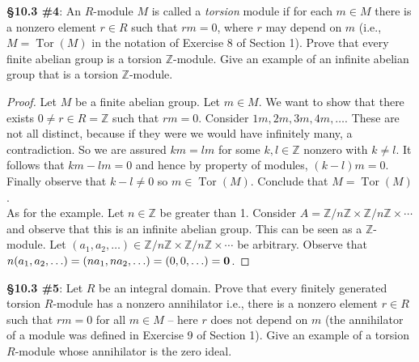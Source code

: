 \documentclass[8pt]{amsart}
\theoremstyle{plain}%
\theoremstyle{definition}
\theoremstyle{remark}
\numberwithin{equation}{section}
\newcommand{\Z}{\mathbb{Z}}
\begin{document}
\textbf{\S 10.3 \#4}: An $R$-module $M$ is called a \textit{torsion} module if for each $m \in M$ there is a nonzero element $r \in R$ such that $rm = 0$, where $r$ may depend on $m$ (i.e., $M = \operatorname{Tor}(M)$ in the notation of Exercise 8 of Section 1). Prove that every finite abelian group is a torsion $\Z$-module. Give an example of an infinite abelian group that is a torsion $\Z$-module.
	\begin{proof}
	
		Let $M$ be a finite abelian group. Let $m \in M$. We want to show that there exists $0 \neq r \in R = \Z$ such that $rm = 0$. Consider $1m, 2m, 3m, 4m, \ldots$. These are not all distinct, because if they were we would have infinitely many, a contradiction. So we are assured $km = lm$ for some $k, l \in \Z$ nonzero with $k \neq l$. It follows that $km - lm = 0$ and hence by property of modules, $(k - l)m = 0$. Finally observe that $k - l \neq 0$ so $m \in \operatorname{Tor}(M)$. Conclude that $M = \operatorname{Tor}(M)$.\\

		As for the example. Let $n \in \Z$ be greater than 1. Consider $A = \Z/n\Z \times \Z/n\Z \times \cdots$ and observe that this is an infinite abelian group. This can be seen as a $\Z$-module. Let $(a_1, a_2, \ldots) \in \Z/n\Z \times \Z/n\Z \times \cdots$ be arbitrary. Observe that $n(a_1, a_2, \ldots) = (na_1, na_2, \ldots) = (0, 0, \ldots) = \textbf 0$.
	\end{proof}
\textbf{\S 10.3 \#5}: Let $R$ be an integral domain. Prove that every finitely generated torsion $R$-module has a nonzero annihilator i.e., there is a nonzero element $r \in R$ such that $rm = 0$ for all $m \in M$ -- here $r$ does not depend on $m$ (the annihilator of a module was defined in Exercise 9 of Section 1). Give an example of a torsion $R$-module whose annihilator is the zero ideal.
\end{document}
